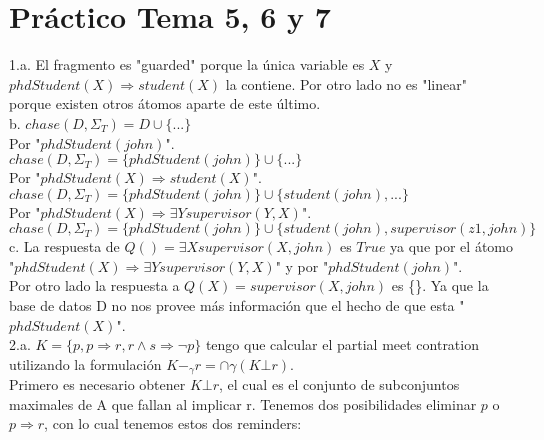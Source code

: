 \chapter{Práctico Tema 5, 6 y 7}

1.a. El fragmento es "guarded" porque la única variable es $X$ y $phdStudent(X) \Longrightarrow student(X)$ la contiene. Por otro lado no es "linear" porque existen otros átomos aparte de este último. \\

b. $chase(D, \Sigma_{T}) = D \cup \{...\}$ \\

Por "$phdStudent(john)$".\\

$chase(D, \Sigma_{T}) = \{phdStudent(john)\} \cup \{ ... \}$ \\

Por "$phdStudent(X) \Longrightarrow student(X)$". \\

$chase(D, \Sigma_{T}) = \{phdStudent(john)\} \cup \{student(john), ...\}$\\

Por "$phdStudent(X) \Longrightarrow \exists Y supervisor(Y, X)$". \\

$chase(D, \Sigma_{T}) = \{phdStudent(john)\} \cup \{student(john), supervisor(z1, john) \}$ \\

c. La respuesta de $Q() = \exists X supervisor(X, john)$ es $True$ ya que por el átomo "$phdStudent(X) \Longrightarrow \exists Y supervisor(Y, X)$" y por "$phdStudent(john)$". \\

Por otro lado la respuesta a $Q(X) = supervisor(X, john)$ es \{\}. Ya que la base de datos D no nos provee más información que el hecho de que 
esta "$phdStudent(X)$". \\

2.a. $K = \{p, p \Longrightarrow r , r \land s \Longrightarrow \neg p \}$ tengo que calcular el partial meet contration utilizando la formulación $K-_{\gamma}r = \cap\gamma(K \bot r)$. \\

Primero es necesario obtener $K \bot r$, el cual es el conjunto de subconjuntos maximales de A que fallan al implicar r. Tenemos dos posibilidades eliminar $p$ o $p \Longrightarrow  r$, con lo cual tenemos estos dos reminders: \\

